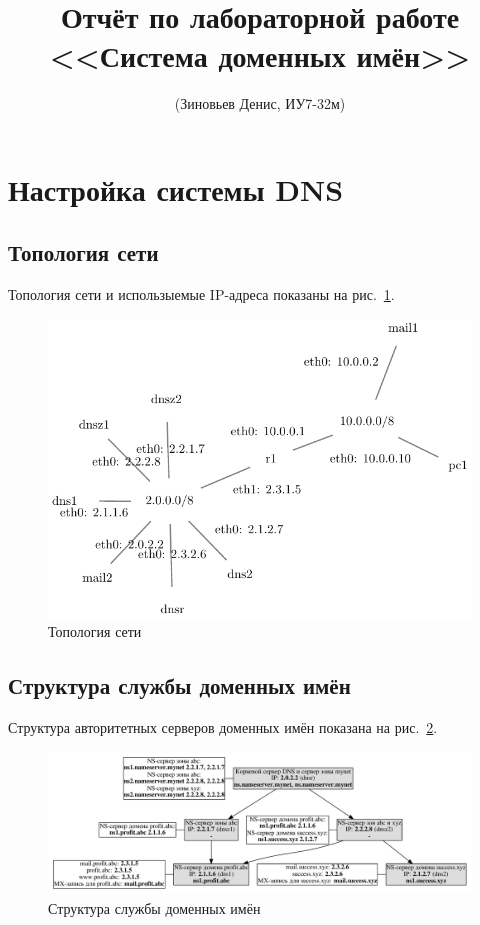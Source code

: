 \documentclass[a4paper,12pt]{article}
\title{Отчёт по лабораторной работе \\ <<Система доменных имён>>}
\author{(Зиновьев Денис, ИУ7-32м)}
\begin{document}
\maketitle

\tableofcontents

\section{Настройка системы DNS}

\subsection{Топология сети}

Топология сети и использыемые IP-адреса показаны на рис.~\ref{fig:network}.

\begin{figure}
\centering
\includegraphics[width=\textwidth]{includes/network_gv.pdf}
\caption{Топология сети}
\label{fig:network}
\end{figure}

\subsection{Структура службы доменных имён}

Структура авторитетных серверов доменных имён показана на рис.~\ref{fig:dns}.

\begin{figure}
\centering
\includegraphics[width=\textwidth]{includes/dns_gv.pdf}
\caption{Структура службы доменных имён}
\label{fig:dns}
\end{figure}
\end{document}
